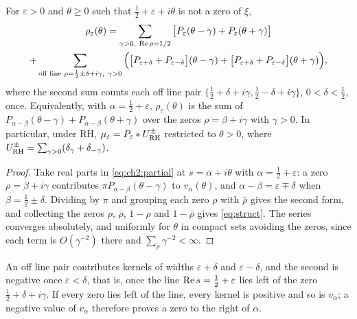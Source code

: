 \begin{proposition}\label{prop:struct}
For $\varepsilon>0$ and $\theta\ge0$ such that $\frac12+\varepsilon+i\theta$ is not a zero of $\xi$,
\begin{multline}\label{eq:struct}
\rho_\varepsilon(\theta)=\sum_{\gamma>0,\ \re\rho=1/2}\big[P_\varepsilon(\theta-\gamma)+P_\varepsilon(\theta+\gamma)\big]\\
+\sum_{\text{off line }\rho=\frac12\pm\delta+i\gamma,\ \gamma>0}\Big(\big[P_{\varepsilon+\delta}+P_{\varepsilon-\delta}\big](\theta-\gamma)+\big[P_{\varepsilon+\delta}+P_{\varepsilon-\delta}\big](\theta+\gamma)\Big),
\end{multline}
where the second sum counts each off line pair $\{\frac12+\delta+i\gamma,\frac12-\delta+i\gamma\}$, $0<\delta<\frac12$, once. Equivalently, with $\alpha=\frac12+\varepsilon$, $\rho_\varepsilon(\theta)$ is the sum of $P_{\alpha-\beta}(\theta-\gamma)+P_{\alpha-\beta}(\theta+\gamma)$ over the zeros $\rho=\beta+i\gamma$ with $\gamma>0$. In particular, under RH, $\mu_\varepsilon=P_\varepsilon*U^{\pm}_{\mathrm{RH}}$ restricted to $\theta>0$, where $U^\pm_{\mathrm{RH}}=\sum_{\gamma>0}(\delta_\gamma+\delta_{-\gamma})$.
\end{proposition}

\begin{proof}
Take real parts in \eqref{eq:ch2:partial} at $s=\alpha+i\theta$ with $\alpha=\tfrac12+\varepsilon$: a zero $\rho=\beta+i\gamma$ contributes $\pi P_{\alpha-\beta}(\theta-\gamma)$ to $v_\alpha(\theta)$, and $\alpha-\beta=\varepsilon\mp\delta$ when $\beta=\frac12\pm\delta$. Dividing by $\pi$ and grouping each zero $\rho$ with $\bar\rho$ gives the second form, and collecting the zeros $\rho$, $\bar\rho$, $1-\rho$ and $1-\bar\rho$ gives \eqref{eq:struct}. The series converges absolutely, and uniformly for $\theta$ in compact sets avoiding the zeros, since each term is $O(\gamma^{-2})$ there and $\sum_\rho\gamma^{-2}<\infty$.
\end{proof}

An off line pair contributes kernels of widths $\varepsilon+\delta$ and $\varepsilon-\delta$, and the second is negative once $\varepsilon<\delta$, that is, once the line $\operatorname{Re} s=\frac12+\varepsilon$ lies left of the zero $\frac12+\delta+i\gamma$. If every zero lies left of the line, every kernel is positive and so is $v_\alpha$; a negative value of $v_\alpha$ therefore proves a zero to the right of $\alpha$.

